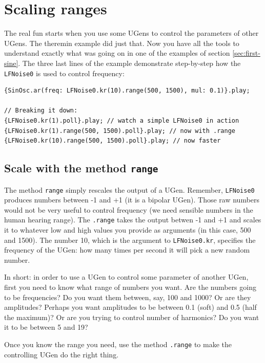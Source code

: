 \section{Scaling ranges}

The real fun starts when you use some UGens to control the parameters of other UGens. The theremin example did just that. Now you have all the tools to understand exactly what was going on in one of the examples of section \ref{sec:first-sine}. The three last lines of the example demonstrate step-by-step how the \texttt{LFNoise0} is used to control frequency:

\begin{lstlisting}[style=SuperCollider-IDE, basicstyle=\scttfamily\footnotesize]
{SinOsc.ar(freq: LFNoise0.kr(10).range(500, 1500), mul: 0.1)}.play;

// Breaking it down:
{LFNoise0.kr(1).poll}.play; // watch a simple LFNoise0 in action
{LFNoise0.kr(1).range(500, 1500).poll}.play; // now with .range
{LFNoise0.kr(10).range(500, 1500).poll}.play; // now faster
\end{lstlisting}

\subsection{Scale with the method \texttt{range}}
The method \texttt{range} simply rescales the output of a UGen. Remember, \texttt{LFNoise0} produces numbers between -1 and +1 (it is a bipolar UGen). Those raw numbers would not be very useful to control frequency (we need sensible numbers in the human hearing range). The \texttt{.range} takes the output betwen -1 and +1 and scales it to whatever low and high values you provide as arguments (in this case, 500 and 1500). The number 10, which is the argument to \texttt{LFNoise0.kr}, specifies the frequency of the UGen: how many times per second it will pick a new random number.

In short: in order to use a UGen to control some parameter of another UGen, first you need to know what range of numbers you want. Are the numbers going to be frequencies? Do you want them between, say, 100 and 1000? Or are they amplitudes? Perhaps you want amplitudes to be between 0.1 (soft) and 0.5 (half the maximum)? Or are you trying to control number of harmonics? Do you want it to be between 5 and 19? 

Once you know the range you need, use the method \texttt{.range} to make the controlling UGen do the right thing.

